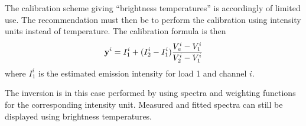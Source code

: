  The calibration scheme giving ``brightness temperatures'' is
 accordingly of limited use. The recommendation must then be to 
 perform the calibration using intensity units instead of temperature.
 The calibration formula is then
 \begin{equation}
   \mathbf{y}^i = I_1^i + (I_2^i-I_1^i)\frac{V_a^i-V_1^i}{V_2^i-V_1^i}
 \end{equation}
 where $I_1^i$ is the estimated emission intensity for load 1 and
 channel $i$. 
 
 The inversion is in this case performed by using spectra and
 weighting functions for the corresponding intensity unit. 
 Measured and fitted spectra can still be displayed using brightness
 temperatures. 

 
 
 



